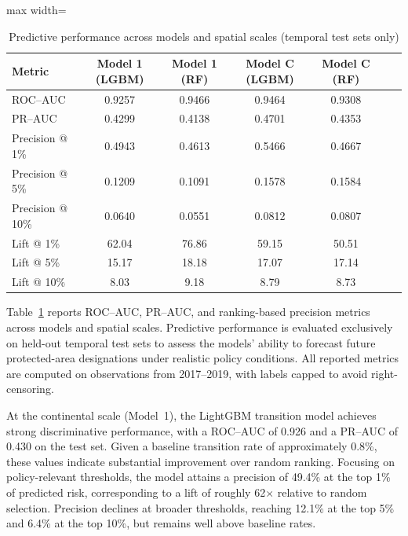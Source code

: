 \documentclass[12pt]{article}
\theoremstyle{break} %
\begin{document}
\begin{table}[htbp]
\centering
\caption{Predictive performance across models and spatial scales (temporal test sets only)}
\label{tab:predictive_performance}
\begin{adjustbox}{max width=\textwidth}
\begin{tabular}{lcccccc}
\hline
\textbf{Metric} 
& \textbf{Model 1 (LGBM)} 
& \textbf{Model 1 (RF)} 
& \textbf{Model C (LGBM)} 
& \textbf{Model C (RF)} \\
\hline
ROC--AUC            & 0.9257 & 0.9466 & 0.9464 & 0.9308 \\
PR--AUC             & 0.4299 & 0.4138 & 0.4701 & 0.4353 \\
Precision @ 1\%     & 0.4943 & 0.4613 & 0.5466 & 0.4667 \\
Precision @ 5\%     & 0.1209 & 0.1091 & 0.1578 & 0.1584 \\
Precision @ 10\%    & 0.0640 & 0.0551 & 0.0812 & 0.0807 \\
Lift @ 1\%          & 62.04  & 76.86  & 59.15  & 50.51  \\
Lift @ 5\%          & 15.17  & 18.18  & 17.07  & 17.14  \\
Lift @ 10\%         & 8.03   & 9.18   & 8.79   & 8.73  \\
\hline
\end{tabular}
\end{adjustbox}
\end{table}

Table~\ref{tab:predictive_performance} reports ROC--AUC, PR--AUC, and ranking-based precision metrics across models and spatial scales. Predictive performance is evaluated exclusively on held-out temporal test sets to assess the models’ ability to forecast future protected-area designations under realistic policy conditions. All reported metrics are computed on observations from 2017--2019, with labels capped to avoid right-censoring.

At the continental scale (Model~1), the LightGBM transition model achieves strong discriminative performance, with a ROC--AUC of 0.926 and a PR--AUC of 0.430 on the test set. Given a baseline transition rate of approximately 0.8\%, these values indicate substantial improvement over random ranking. Focusing on policy-relevant thresholds, the model attains a precision of 49.4\% at the top 1\% of predicted risk, corresponding to a lift of roughly 62$\times$ relative to random selection. Precision declines at broader thresholds, reaching 12.1\% at the top 5\% and 6.4\% at the top 10\%, but remains well above baseline rates.
\end{document}
